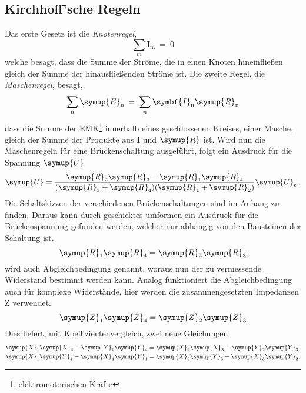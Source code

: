 \subsection{Kirchhoff'sche Regeln}
Das erste Gesetz ist die \emph{Knotenregel},
\begin{equation}
  \sum_m \symbf{I}_\text{m} \: = \: 0
\end{equation}
welche besagt, dass die Summe der Ströme, die in einen Knoten hineinfließen
gleich der Summe der hinausfließenden Ströme ist.
Die zweite Regel, die \emph{Maschenregel}, besagt,
\begin{equation}
  \sum_n \symup{E}_\text{n} \: = \: \sum_n \symbf{I}_\text{n} \symup{R}_\text{n}
\end{equation}
dass die Summe der EMK\footnote{elektromotorischen Kräfte} innerhalb
eines geschlossenen Kreises, einer Masche, gleich der Summe der Produkte aus
$\symbf{I}$ und $\symup{R}$ ist.
Wird nun die Maschenregeln für eine Brückenschaltung ausgeführt,
folgt ein Ausdruck für die Spannung $\symup{U}$
\begin{equation}
      \symup{U} = \frac{\symup{R}_2 \symup{R}_3 - \symup{R}_1 \symup{R}_4}
      {(\symup{R}_3 + \symup{R}_4)
      (\symup{R}_1 + \symup{R}_2)} \symup{U}_\text{s} \,.
      \label{eqn:quotient}
\end{equation}
Die Schaltskizzen der verschiedenen Brückenschaltungen sind im Anhang zu finden.
Daraus kann durch geschicktes umformen ein Ausdruck für die
Brückenspannung gefunden werden, welcher nur abhängig von den Bausteinen
der Schaltung ist.
\begin{equation}
  \symup{R}_1 \symup{R}_4 = \symup{R}_2 \symup{R}_3
\end{equation}
wird auch Abgleichbedingung genannt, woraus nun der
zu vermessende Widerstand bestimmt werden kann.
Analog funktioniert die Abgleichbedingung auch für komplexe Widerstände,
hier werden die zusammengesetzten Impedanzen Z verwendet.
\begin{equation}
  \symup{Z}_1 \symup{Z}_4 = \symup{Z}_2 \symup{Z}_3
\end{equation}
Dies liefert, mit Koeffizientenvergleich, zwei neue Gleichungen
\begin{align}
  \symup{X}_1\symup{X}_4 - \symup{Y}_1\symup{Y}_4 &=
  \symup{X}_2\symup{X}_3 - \symup{Y}_2\symup{Y}_3
  \label{eqn:abgleich1} \\
  \symup{X}_1\symup{Y}_4 - \symup{X}_4\symup{Y}_1 &=
  \symup{X}_2\symup{Y}_3 - \symup{X}_3\symup{Y}_2.
  \label{eqn:abgleich2}
\end{align}

